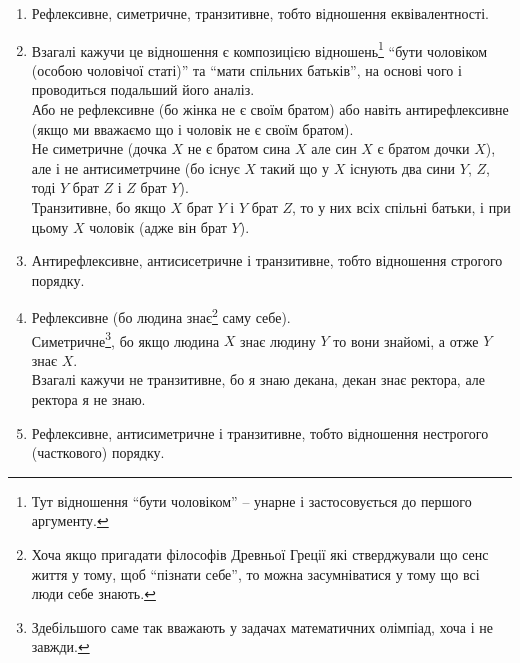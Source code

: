 \begin{solution}
	\nothing
	\begin{enumerate}
		\item Рефлексивне, симетричне, транзитивне, тобто відношення еквівалентності.
		
		\item Взагалі кажучи це відношення є композицією відношень\footnote{Тут відношення ``бути чоловіком'' -- унарне і застосовується до першого аргументу.} ``бути чоловіком (особою чоловічої статі)'' та ``мати спільних батьків'', на основі чого і  проводиться подальший його аналіз. \\

		Або не рефлексивне (бо жінка не є своїм братом) або навіть антирефлексивне (якщо ми вважаємо що і чоловік не є своїм братом). \\

		Не симетричне (дочка $X$ не є братом сина $X$ але син $X$ є братом дочки $X$), але і не антисиметрчине (бо існує $X$ такий що у $X$ існують два сини $Y$, $Z$, тоді $Y$ брат $Z$ і $Z$ брат $Y$). \\

		Транзитивне, бо якщо $X$ брат $Y$ і $Y$ брат $Z$, то у них всіх спільні батьки, і при цьому $X$ чоловік (адже він брат $Y$).

		\item Антирефлексивне, антисисетричне і транзитивне, тобто відношення строгого порядку.

		\item Рефлексивне (бо людина знає\footnote{Хоча якщо пригадати філософів Древньої Греції які стверджували що сенс життя у тому, щоб ``пізнати себе'', то можна засумніватися у тому що всі люди себе знають.} саму себе). \\

		Симетричне\footnote{Здебільшого саме так вважають у задачах математичних олімпіад, хоча і не завжди.}, бо якщо людина $X$ знає людину $Y$ то вони знайомі, а отже $Y$ знає $X$. \\

		Взагалі кажучи не транзитивне, бо я знаю декана, декан знає ректора, але ректора я не знаю. 

		\item Рефлексивне, антисиметричне і транзитивне, тобто відношення нестрогого (часткового) порядку.
	\end{enumerate}
\end{solution}

\newpage

